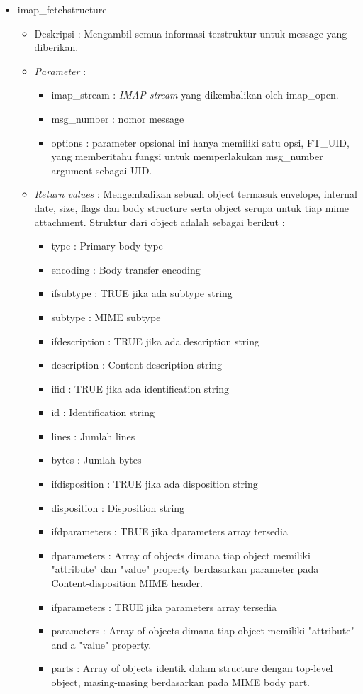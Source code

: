 \begin{itemize}
\item imap\_fetchstructure
\begin{itemize}
\item Deskripsi : Mengambil semua informasi terstruktur untuk message yang diberikan.
\item \textit{Parameter} :
\begin{itemize}
\item imap\_stream : \textit{IMAP stream} yang dikembalikan oleh imap\_open.
\item msg\_number : nomor message
\item options : parameter opsional ini hanya memiliki satu opsi, FT\_UID, yang memberitahu fungsi untuk memperlakukan msg\_number argument sebagai UID.
\end{itemize}
\item \textit{Return values} : Mengembalikan sebuah object termasuk envelope, internal date, size, flags dan body structure serta object serupa untuk tiap mime attachment. Struktur dari object adalah sebagai berikut :
 \begin{itemize}
 \item type : Primary body type
 \item encoding : Body transfer encoding
 \item ifsubtype : TRUE jika ada subtype string
 \item subtype : MIME subtype
 \item ifdescription : TRUE jika ada description string
 \item description : Content description string
 \item ifid : TRUE jika ada identification string
 \item id : Identification string
 \item lines : Jumlah lines
 \item bytes : Jumlah bytes
 \item ifdisposition : TRUE jika ada disposition string
 \item disposition : Disposition string
 \item ifdparameters : TRUE jika dparameters array tersedia
 \item dparameters : Array of objects dimana tiap object memiliki "attribute" dan "value" property berdasarkan parameter pada Content-disposition MIME header.
 \item ifparameters : TRUE jika parameters array tersedia
 \item parameters : Array of objects dimana tiap object memiliki "attribute" and a "value" property.
 \item parts : Array of objects identik dalam structure dengan top-level object, masing-masing berdasarkan pada MIME body part.
 \end{itemize}
\end{itemize}


\end{itemize}
